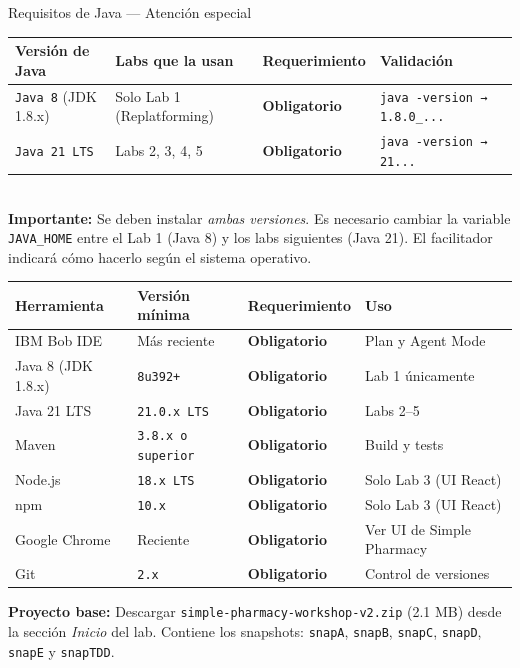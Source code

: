 \documentclass[11pt, a4paper]{article}
\newcommand{\version}[1]{\texttt{\textcolor{ibmblue}{#1}}}
\newcommand{\cmd}[1]{\texttt{\textcolor{ibmdark}{\small #1}}}
\newcommand{\req}[1]{\textbf{\textcolor{ibmred}{#1}}}
\begin{document}
\begin{labbox}[ibmpurple]{\faJava\quad Requisitos de Java — Atención especial}
\begin{tabular}{@{}llll@{}}
\toprule
\textbf{Versión de Java} & \textbf{Labs que la usan} & \textbf{Requerimiento} & \textbf{Validación} \\
\midrule
\version{Java 8} (JDK 1.8.x) & Solo Lab 1 (Replatforming) & \req{Obligatorio} & \cmd{java -version → 1.8.0\_...} \\
\version{Java 21 LTS} & Labs 2, 3, 4, 5 & \req{Obligatorio} & \cmd{java -version → 21...} \\
\bottomrule
\end{tabular}
\vspace{6pt}\\
\textbf{Importante:} Se deben instalar \emph{ambas versiones}. Es necesario cambiar la variable \cmd{JAVA\_HOME} entre el Lab 1 (Java 8) y los labs siguientes (Java 21). El facilitador indicará cómo hacerlo según el sistema operativo.
\end{labbox}

\vspace{10pt}
\begin{tabular}{@{}llll@{}}
\toprule
\textbf{Herramienta} & \textbf{Versión mínima} & \textbf{Requerimiento} & \textbf{Uso} \\
\midrule
IBM Bob IDE & Más reciente & \req{Obligatorio} & Plan y Agent Mode \\
Java 8 (JDK 1.8.x) & \version{8u392+} & \req{Obligatorio} & Lab 1 únicamente \\
Java 21 LTS & \version{21.0.x LTS} & \req{Obligatorio} & Labs 2–5 \\
Maven & \version{3.8.x o superior} & \req{Obligatorio} & Build y tests \\
Node.js & \version{18.x LTS} & \req{Obligatorio} & Solo Lab 3 (UI React) \\
npm & \version{10.x} & \req{Obligatorio} & Solo Lab 3 (UI React) \\
Google Chrome & Reciente & \req{Obligatorio} & Ver UI de Simple Pharmacy \\
Git & \version{2.x} & \req{Obligatorio} & Control de versiones \\
\bottomrule
\end{tabular}

\vspace{10pt}
\begin{infobox}
  \textbf{Proyecto base:} Descargar \texttt{simple-pharmacy-workshop-v2.zip} (2.1 MB) desde la sección \emph{Inicio} del lab. Contiene los snapshots: \texttt{snapA}, \texttt{snapB}, \texttt{snapC}, \texttt{snapD}, \texttt{snapE} y \texttt{snapTDD}.
\end{infobox}
\end{document}
